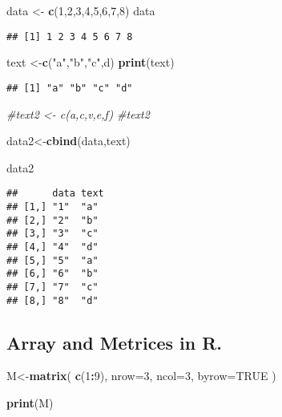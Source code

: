 \documentclass[
]{article}
\newenvironment{Shaded}{\begin{snugshade}}{\end{snugshade}}
\newcommand{\AttributeTok}[1]{\textcolor[rgb]{0.13,0.29,0.53}{#1}}
\newcommand{\CommentTok}[1]{\textcolor[rgb]{0.56,0.35,0.01}{\textit{#1}}}
\newcommand{\ConstantTok}[1]{\textcolor[rgb]{0.56,0.35,0.01}{#1}}
\newcommand{\DecValTok}[1]{\textcolor[rgb]{0.00,0.00,0.81}{#1}}
\newcommand{\FunctionTok}[1]{\textcolor[rgb]{0.13,0.29,0.53}{\textbf{#1}}}
\newcommand{\NormalTok}[1]{#1}
\newcommand{\OtherTok}[1]{\textcolor[rgb]{0.56,0.35,0.01}{#1}}
\newcommand{\SpecialCharTok}[1]{\textcolor[rgb]{0.81,0.36,0.00}{\textbf{#1}}}
\newcommand{\StringTok}[1]{\textcolor[rgb]{0.31,0.60,0.02}{#1}}
\begin{document}
\begin{Shaded}
\begin{Highlighting}[]
\NormalTok{data }\OtherTok{\textless{}{-}} \FunctionTok{c}\NormalTok{(}\DecValTok{1}\NormalTok{,}\DecValTok{2}\NormalTok{,}\DecValTok{3}\NormalTok{,}\DecValTok{4}\NormalTok{,}\DecValTok{5}\NormalTok{,}\DecValTok{6}\NormalTok{,}\DecValTok{7}\NormalTok{,}\DecValTok{8}\NormalTok{)}
\NormalTok{data}
\end{Highlighting}
\end{Shaded}

\begin{verbatim}
## [1] 1 2 3 4 5 6 7 8
\end{verbatim}

\begin{Shaded}
\begin{Highlighting}[]
\NormalTok{text }\OtherTok{\textless{}{-}}\FunctionTok{c}\NormalTok{(}\StringTok{"a"}\NormalTok{,}\StringTok{"b"}\NormalTok{,}\StringTok{"c"}\NormalTok{,}\StringTok{\textquotesingle{}d\textquotesingle{}}\NormalTok{)}
\FunctionTok{print}\NormalTok{(text)}
\end{Highlighting}
\end{Shaded}

\begin{verbatim}
## [1] "a" "b" "c" "d"
\end{verbatim}

\begin{Shaded}
\begin{Highlighting}[]
\CommentTok{\#text2 \textless{}{-} c(a,c,v,e,f)}
\CommentTok{\#text2}

\NormalTok{data2}\OtherTok{\textless{}{-}}\FunctionTok{cbind}\NormalTok{(data,text)}

\NormalTok{data2}
\end{Highlighting}
\end{Shaded}

\begin{verbatim}
##      data text
## [1,] "1"  "a" 
## [2,] "2"  "b" 
## [3,] "3"  "c" 
## [4,] "4"  "d" 
## [5,] "5"  "a" 
## [6,] "6"  "b" 
## [7,] "7"  "c" 
## [8,] "8"  "d"
\end{verbatim}

\subsection{Array and Metrices in R.}\label{array-and-metrices-in-r.}

\begin{Shaded}
\begin{Highlighting}[]
\NormalTok{M}\OtherTok{\textless{}{-}}\FunctionTok{matrix}\NormalTok{(}
\FunctionTok{c}\NormalTok{(}\DecValTok{1}\SpecialCharTok{:}\DecValTok{9}\NormalTok{),}
\AttributeTok{nrow=}\DecValTok{3}\NormalTok{,}
\AttributeTok{ncol=}\DecValTok{3}\NormalTok{,}
\AttributeTok{byrow=}\ConstantTok{TRUE}
\NormalTok{)}

\FunctionTok{print}\NormalTok{(M)}
\end{Highlighting}
\end{Shaded}
\end{document}
